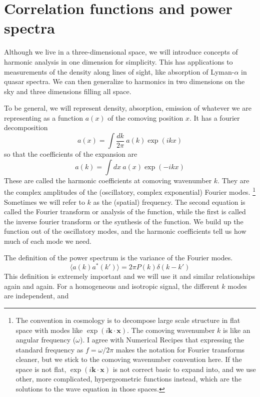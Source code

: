\chapter{Correlation functions and power spectra}

Although we live in a three-dimensional space, we will introduce concepts of harmonic analysis in one dimension for simplicity.  This has applications to measurements of the density along lines of sight, like absorption of Lyman-$\alpha$ in quasar spectra.  We can then generalize to harmonics in two dimensions on the sky and three dimensions filling all space.

To be general, we will represent density, absorption, emission of whatever we are representing as a function $a(x)$ of the comoving position $x$.  It has a fourier decomposition
\begin{equation}
  a(x) = \int \frac{dk}{2\pi}\ a(k) \exp(i kx) 
\end{equation}
so that the coefficients of the expansion are 
\begin{equation}
  a(k) = \int dx\ a(x) \exp(-i kx)
\end{equation}
These are called the harmonic coefficients at comoving wavenumber $k$.  They are the complex amplitudes of the (oscillatory, complex exponential) Fourier modes.%
%
\footnote{The convention in cosmology is to decompose large scale structure in flat space with modes like $\exp(i \mathbf{k} \cdot \mathbf{x})$.  The comoving wavenumber $k$ is like an angular frequency ($\omega$).  I agree with Numerical Recipes \citep{} that expressing the standard frequency as $f = \omega/2\pi$ makes the notation for Fourier transforms cleaner, but  we stick to the comoving wavenumber convention here.  If the space is not flat, $\exp(i \mathbf{k}\cdot \mathbf{x})$ is not correct basic to expand into, and we use other, more complicated, hypergeometric functions instead, which are the solutions to the wave equation in those spaces.}  Sometimes we will refer to $k$ as the (spatial) frequency.
The second equation is called the Fourier transform or analysis of the function, while the first is called the inverse fourier transform or the synthesis of the function.  We build up the function out of the oscillatory modes, and the harmonic coefficients tell us how much of each mode we need.

The definition of the power spectrum is the variance of the Fourier modes.
\begin{equation}
  \langle a(k) a^*(k') \rangle = 2\pi P(k) \delta(k - k') 
\end{equation}
This definition is extremely important and we will use it and similar relationships again and again.  For a homogeneous and isotropic signal, the different $k$ modes are independent, and 

